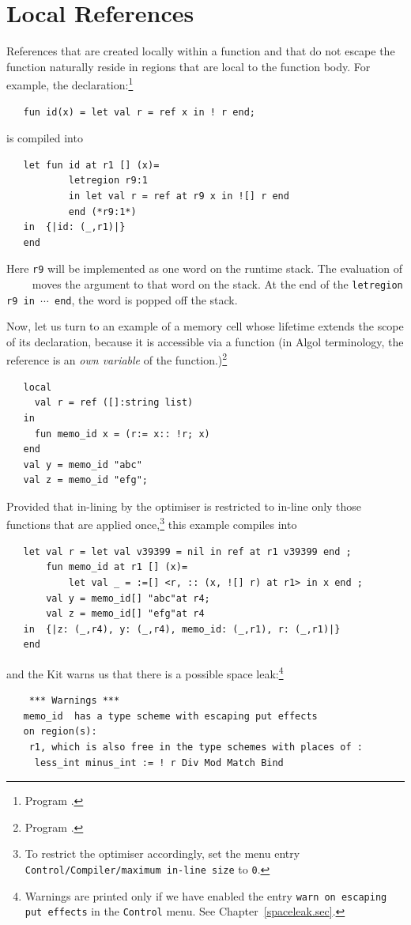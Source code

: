 \documentclass[12pt]{book}
\begin{document}
\section{Local References}
References  that are created locally within a
function and that do not escape the function naturally reside in
regions that are local to the function body.  For example, the
declaration:\footnote{Program .}
\begin{verbatim}
   fun id(x) = let val r = ref x in ! r end;
\end{verbatim}
is compiled into
\begin{verbatim}
   let fun id at r1 [] (x)= 
           letregion r9:1 
           in let val r = ref at r9 x in ![] r end  
           end (*r9:1*)
   in  {|id: (_,r1)|}
   end 
\end{verbatim}
Here {\tt r9} will be implemented as one word on the runtime stack.
The evaluation of ~~~~ moves the argument 
to that word on the stack. At the end of the {\tt letregion r9 in
  $\cdots$ end}, the word is popped off the stack.

Now, let us turn to an example of a memory cell whose lifetime extends
the scope of its declaration, because it is accessible via a function
(in Algol terminology, the reference is an {\em own variable}
%
of the function.)\footnote{Program .}
\begin{verbatim}
   local
     val r = ref ([]:string list)
   in
     fun memo_id x = (r:= x:: !r; x)
   end
   val y = memo_id "abc"
   val z = memo_id "efg";
\end{verbatim}
Provided that in-lining by the optimiser is restricted to in-line only
those functions that are applied once,\footnote{To restrict the
  optimiser accordingly, set the menu entry {\tt Control/Compiler/maximum
    in-line size} to {\tt 0}.} this example compiles into
\begin{verbatim}
   let val r = let val v39399 = nil in ref at r1 v39399 end ; 
       fun memo_id at r1 [] (x)= 
           let val _ = :=[] <r, :: (x, ![] r) at r1> in x end ; 
       val y = memo_id[] "abc"at r4; 
       val z = memo_id[] "efg"at r4
   in  {|z: (_,r4), y: (_,r4), memo_id: (_,r1), r: (_,r1)|}
   end 
\end{verbatim}
and the Kit warns us that there is a possible space
leak:\footnote{Warnings are printed only if we have enabled the entry
  {\tt warn on escaping put effects} in the {\tt Control} menu. See
  Chapter~\ref{spaceleak.sec}.}
\begin{verbatim}
    *** Warnings ***
   memo_id  has a type scheme with escaping put effects 
   on region(s): 
    r1, which is also free in the type schemes with places of :  
     less_int minus_int := ! r Div Mod Match Bind
\end{verbatim}
\end{document}
